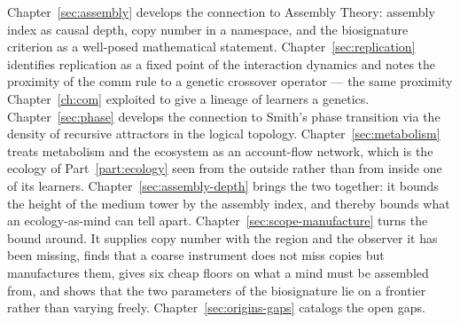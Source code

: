 Chapter~\ref{sec:assembly} develops the connection to Assembly Theory:
assembly index as causal depth, copy number in a namespace, and the
biosignature criterion as a well-posed mathematical statement.
Chapter~\ref{sec:replication} identifies replication as a fixed point of
the interaction dynamics and notes the proximity of the comm rule to a
genetic crossover operator --- the same proximity
Chapter~\ref{ch:com} exploited to give a lineage of learners a genetics.
Chapter~\ref{sec:phase} develops the connection to Smith's phase
transition via the density of recursive attractors in the logical
topology.
Chapter~\ref{sec:metabolism} treats metabolism and the ecosystem as an
account-flow network, which is the ecology of Part~\ref{part:ecology}
seen from the outside rather than from inside one of its learners.
Chapter~\ref{sec:assembly-depth} brings the two together: it bounds the
height of the medium tower by the assembly index, and thereby bounds what
an ecology-as-mind can tell apart.
Chapter~\ref{sec:scope-manufacture} turns the bound around.
It supplies copy number with the region and the observer it has been
missing, finds that a coarse instrument does not miss copies but
manufactures them, gives six cheap floors on what a mind must be
assembled from, and shows that the two parameters of the biosignature
lie on a frontier rather than varying freely.
Chapter~\ref{sec:origins-gaps} catalogs the open gaps.


